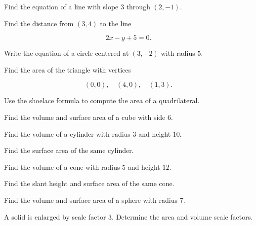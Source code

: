 \begin{exercise}[2]
Find the equation of a line with slope \(3\) through \((2,-1)\).
\end{exercise}

\begin{exercise}[2]
Find the distance from \((3,4)\) to the line

\[
2x-y+5=0.
\]
\end{exercise}

\begin{exercise}[2]
Write the equation of a circle centered at \((3,-2)\) with radius \(5\).
\end{exercise}

\begin{exercise}[2]
Find the area of the triangle with vertices

\[
(0,0),
\quad
(4,0),
\quad
(1,3).
\]
\end{exercise}

\begin{exercise}[3]
Use the shoelace formula to compute the area of a quadrilateral.
\end{exercise}

\begin{exercise}[2]
Find the volume and surface area of a cube with side \(6\).
\end{exercise}

\begin{exercise}[2]
Find the volume of a cylinder with radius \(3\) and height \(10\).
\end{exercise}

\begin{exercise}[2]
Find the surface area of the same cylinder.
\end{exercise}

\begin{exercise}[2]
Find the volume of a cone with radius \(5\) and height \(12\).
\end{exercise}

\begin{exercise}[2]
Find the slant height and surface area of the same cone.
\end{exercise}

\begin{exercise}[2]
Find the volume and surface area of a sphere with radius \(7\).
\end{exercise}

\begin{exercise}[2]
A solid is enlarged by scale factor \(3\). Determine the area and volume
scale factors.
\end{exercise}

